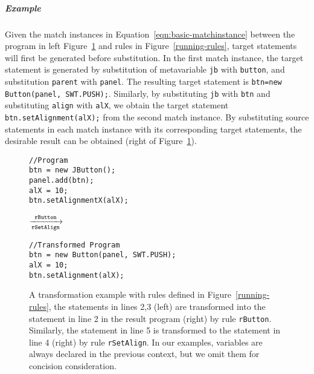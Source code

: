 \documentclass[letterpaper, USenglish]{lipics-v2016}
\newenvironment{smpage}[1]
{\begin{lrbox}{\fmbox}\begin{minipage}{#1}}
{\end{minipage}\end{lrbox}\usebox{\fmbox}}
\newcommand{\code}[1]{\texttt{\footnotesize #1}}
\theoremstyle{plain}
\begin{document}
\subparagraph*{Example} Given the match instances in Equation~\ref{eqn:basic-matchinstance} between the program in left Figure~\ref{running-eg1} and rules in Figure~\ref{running-rules}, target statements will first be generated before substitution. In the first match instance, the target statement is generated by substitution of metavariable \code{jb} with \code{button}, and substitution \code{parent} with \code{panel}. The resulting target statement is \code{btn=new Button(panel, SWT.PUSH);}. Similarly, by substituting \code{jb} with \code{btn} and substituting \code{align} with \code{alX}, we obtain the target statement \code{btn.setAlignment(alX);} from the second match instance. By substituting source statements in each match instance with its corresponding target statements, the desirable result can be obtained (right of Figure~\ref{running-eg1}).

\begin{figure}[ht]
\footnotesize
\vspace{-10pt}
\begin{center}
\begin{smpage}{0.27\columnwidth}
\begin{lstlisting}[style=patl,frame=none,basicstyle=\scriptsize\ttfamily]
//Program
btn = new JButton();
panel.add(btn);
alX = 10;
btn.setAlignmentX(alX);
\end{lstlisting}
\end{smpage}
\!\!$\xrightarrow[\texttt{\scriptsize rSetAlign}]{\texttt{\scriptsize rButton}}$~~~~
\begin{smpage}{0.4\columnwidth}
\begin{lstlisting}[style=patl,frame=none, basicstyle=\scriptsize\ttfamily]
//Transformed Program
btn = new Button(panel, SWT.PUSH);
alX = 10;
btn.setAlignment(alX);
\end{lstlisting}
\end{smpage}
\end{center}
\vspace{-15pt}
\caption{A transformation example with rules defined in Figure~\ref{running-rules}, the statements in lines 2,3 (left) are transformed into the statement in line 2 in the result program (right) by rule \code{rButton}. Similarly, the statement in line 5 is transformed to the statement in line 4 (right) by rule \code{rSetAlign}. In our examples, variables are always declared in the previous context, but we omit them for concision consideration. }
\label{running-eg1}
\end{figure}
\end{document}
